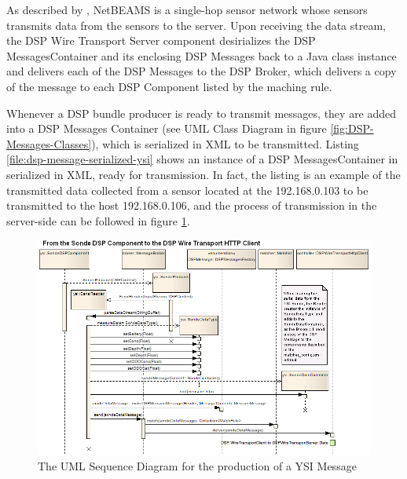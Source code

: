 As described by \cite{netbeams2009}, NetBEAMS is a single-hop sensor network
whose sensors transmits data from the sensors to the server. Upon receiving the
data stream, the DSP Wire Transport Server component desirializes the DSP
MessagesContainer and its enclosing DSP Messages back to a Java class instance
and delivers each of the DSP Messages to the DSP Broker, which delivers a
copy of the message to each DSP Component listed by the maching rule. 

Whenever a DSP bundle producer is ready to transmit messages, they are added
into a DSP Messages Container (see UML Class Diagram in figure
\ref{fig:DSP-Messages-Classes}), which is serialized in XML to be transmitted.
Listing \ref{file:dsp-message-serialized-ysi} shows an instance of a DSP
MessagesContainer in serialized in XML, ready for transmission. In fact, the
listing is an example of the transmitted data collected from a sensor located
at the 192.168.0.103 to be transmitted to the host 192.168.0.106, and the
process of transmission in the server-side can be followed in figure
\ref{fig:From-DSPSondeComponent-to-DSPWireTransportClient-Sequence}.

\begin{figure}[!h]
  \centering
  \includegraphics[scale=0.5]{../diagrams/From-DSPSondeComponent-to-DSPWireTransportClient-Sequence}
  \caption{The UML Sequence Diagram for the production of a YSI Message}
  \label{fig:From-DSPSondeComponent-to-DSPWireTransportClient-Sequence}
\end{figure}

